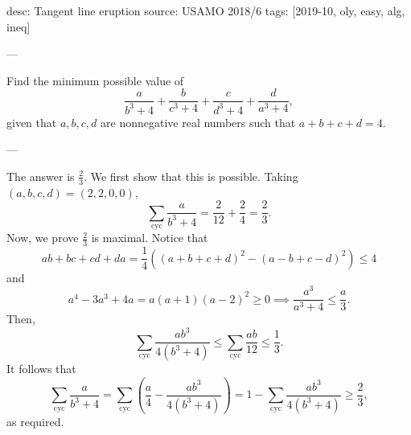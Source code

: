desc: Tangent line eruption
source: USAMO 2018/6
tags: [2019-10, oly, easy, alg, ineq]

---

Find the minimum possible value of \[\frac a{b^3+4}+\frac b{c^3+4}+\frac c{d^3+4}+\frac d{a^3+4},\]
given that $a,b,c,d$ are nonnegative real numbers such that $a+b+c+d=4$.

---

The answer is $\tfrac23$. We first show that this is possible. Taking $(a,b,c,d)=(2,2,0,0)$, \[\sum_{\mathrm{cyc}}\frac a{b^3+4}=\frac2{12}+\frac24=\frac23.\]
Now, we prove $\tfrac23$ is maximal. Notice that \[ab+bc+cd+da=\frac14((a+b+c+d)^2-(a-b+c-d)^2)\le 4\]
and \[a^4-3a^3+4a=a(a+1)(a-2)^2\ge 0\implies\frac{a^3}{a^3+4}\le\frac a3.\]
Then, \[\sum_{\mathrm{cyc}}\frac{ab^3}{4(b^3+4)}\le\sum_{\mathrm{cyc}}\frac{ab}{12}\le\frac13.\]
It follows that \[\sum_{\mathrm{cyc}}\frac a{b^3+4}=\sum_{\mathrm{cyc}}\left(\frac a4-\frac{ab^3}{4(b^3+4)}\right)=1-\sum_{\mathrm{cyc}}\frac{ab^3}{4(b^3+4)}\ge\frac23,\]
as required.
